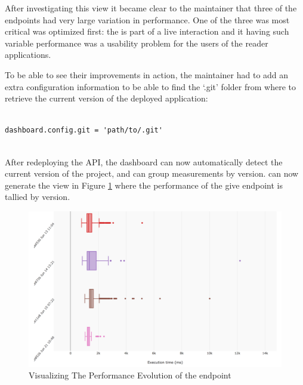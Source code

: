 \documentclass[conference]{IEEEtran}
\begin{document}
  After investigating this view it became clear to the maintainer that three of the endpoints had very large variation in performance. One of the three was most critical was optimized first: the \epTranslations is part of a live interaction and it having such variable performance was a usability problem for the users of the reader applications. 



  \niceseparator

  To be able to see their improvements in action, the maintainer had to add an extra configuration information to be able to find the `.git' folder from where to retrieve the current version of the deployed application: 

  \begin{lstlisting}[caption=Configuring the \tool with the path to the .git folder enables the generation of evolutionary performance graphs, style=custompython]

dashboard.config.git = 'path/to/.git'


    \end{lstlisting}

  After redeploying the API, the dashboard can now automatically detect the current version of the project, and can group measurements by version. \tool can now generate the view in Figure \ref{fig:tee} where the performance of the give endpoint is tallied by version.

    \begin{figure}[h!]
      \centering
      \includegraphics[width=\linewidth]{translation_endpoint_evolution.png}
      \caption{Visualizing The Performance Evolution of the \epTranslations endpoint}
      \label{fig:tee}
    \end{figure}
\end{document}
